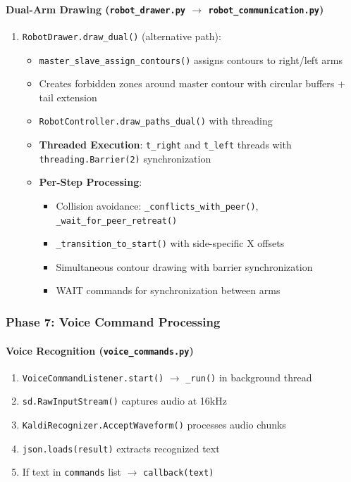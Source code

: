 \documentclass[a4paper,12pt]{article}
\begin{document}
\paragraph{Dual-Arm Drawing (\texttt{robot\_drawer.py} $\rightarrow$ \texttt{robot\_communication.py})}
\begin{enumerate}
\item \texttt{RobotDrawer.draw\_dual()} (alternative path):
	\begin{itemize}
	\item \texttt{master\_slave\_assign\_contours()} assigns contours to right/left arms
	\item Creates forbidden zones around master contour with circular buffers + tail extension
	\item \texttt{RobotController.draw\_paths\_dual()} with threading
	\item \textbf{Threaded Execution}: \texttt{t\_right} and \texttt{t\_left} threads with \texttt{threading.Barrier(2)} synchronization
	\item \textbf{Per-Step Processing}:
		\begin{itemize}
		\item Collision avoidance: \texttt{\_conflicts\_with\_peer()}, \texttt{\_wait\_for\_peer\_retreat()}
		\item \texttt{\_transition\_to\_start()} with side-specific X offsets
		\item Simultaneous contour drawing with barrier synchronization
		\item WAIT commands for synchronization between arms
		\end{itemize}
	\end{itemize}
\end{enumerate}

\subsubsection{Phase 7: Voice Command Processing}

\paragraph{Voice Recognition (\texttt{voice\_commands.py})}
\begin{enumerate}
\item \texttt{VoiceCommandListener.start()} $\rightarrow$ \texttt{\_run()} in background thread
\item \texttt{sd.RawInputStream()} captures audio at 16kHz
\item \texttt{KaldiRecognizer.AcceptWaveform()} processes audio chunks
\item \texttt{json.loads(result)} extracts recognized text
\item If text in \texttt{commands} list $\rightarrow$ \texttt{callback(text)}
\end{enumerate}
\end{document}
